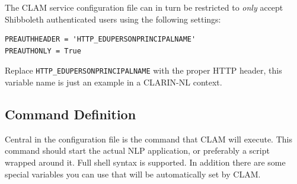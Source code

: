 \documentclass[a4paper,12pt]{report}
\begin{document}
The CLAM service configuration file can in turn be restricted to \emph{only}
accept Shibboleth authenticated users using the following settings:

\begin{verbatim}
PREAUTHHEADER = 'HTTP_EDUPERSONPRINCIPALNAME'
PREAUTHONLY = True
\end{verbatim}

Replace \texttt{HTTP\_EDUPERSONPRINCIPALNAME} with the proper HTTP header, this
variable name is just an example in a CLARIN-NL context.


\subsection{Command Definition} \label{sec:command}

Central in the configuration file is the command that CLAM will execute. This
command should start the actual NLP application, or preferably a script wrapped
around it. Full shell syntax is supported. In addition there are some special
variables you can use that will be automatically set by CLAM. 
\end{document}
